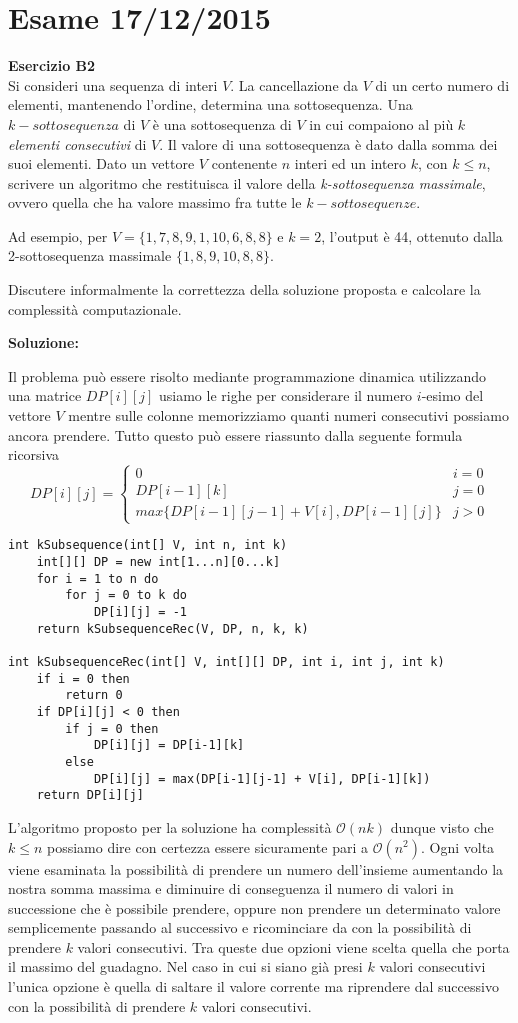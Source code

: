 \documentclass[../cheatSheetAlgoritmi.tex]{subfiles}
\begin{document}
\section{Esame 17/12/2015}
\textbf{Esercizio B2}\\
Si consideri una sequenza di interi $V$. La cancellazione da $V$ di un certo numero di elementi, mantenendo l'ordine, determina una sottosequenza. Una $k-sottosequenza$ di $V$ è una sottosequenza di $V$ in cui compaiono al più $k$ \emph{elementi consecutivi} di $V$. Il valore di una sottosequenza è dato dalla somma dei suoi elementi. Dato un vettore $V$ contenente $n$ interi ed un intero $k$, con $k \leq n$, scrivere un algoritmo che restituisca il valore della \emph{k-sottosequenza massimale}, ovvero quella che ha valore massimo fra tutte le $k-sottosequenze$.

Ad esempio, per $V=\{1,7,8,9,1,10,6,8,8\}$ e $k = 2$, l'output è 44, ottenuto dalla 2-sottosequenza massimale $\{1,8,9,10,8,8\}$.

Discutere informalmente la correttezza della soluzione proposta e calcolare la complessità computazionale.

\textbf{Soluzione:}

Il problema può essere risolto mediante programmazione dinamica utilizzando una matrice $DP[i][j]$ usiamo le righe per considerare il numero $i$-esimo del vettore $V$ mentre sulle colonne memorizziamo quanti numeri consecutivi possiamo ancora prendere. Tutto questo può essere riassunto dalla seguente formula ricorsiva
\begin{equation*}
  	DP[i][j]=\begin{cases}
  		0 & \text{$i = 0$}\\
  		DP[i-1][k] & \text{$j = 0$}\\
  		max\{DP[i-1][j-1] + V[i], DP[i-1][j]\} & \text{$j > 0$}
  	\end{cases}
\end{equation*}
\begin{lstlisting}[caption=k-sottosequenza contigua]
int kSubsequence(int[] V, int n, int k)
	int[][] DP = new int[1...n][0...k]
	for i = 1 to n do
		for j = 0 to k do
			DP[i][j] = -1
	return kSubsequenceRec(V, DP, n, k, k)
	
int kSubsequenceRec(int[] V, int[][] DP, int i, int j, int k)
	if i = 0 then 
		return 0
	if DP[i][j] < 0 then
		if j = 0 then
			DP[i][j] = DP[i-1][k]
		else
			DP[i][j] = max(DP[i-1][j-1] + V[i], DP[i-1][k])
	return DP[i][j]
\end{lstlisting}
L'algoritmo proposto per la soluzione ha complessità $\mathcal{O}(nk)$ dunque visto che $k \leq n$ possiamo dire con certezza essere sicuramente pari a $\mathcal{O}(n^{2})$. Ogni volta viene esaminata la possibilità di prendere un numero dell'insieme aumentando la nostra somma massima e diminuire di conseguenza il numero di valori in successione che è possibile prendere, oppure non prendere un determinato valore semplicemente passando al successivo e ricominciare da con la possibilità di prendere $k$ valori consecutivi. Tra queste due opzioni viene scelta quella che porta il massimo del guadagno. Nel caso in cui si siano già presi $k$ valori consecutivi l'unica opzione è quella di saltare il valore corrente ma riprendere dal successivo con la possibilità di prendere $k$ valori consecutivi.
\newpage
\end{document}
